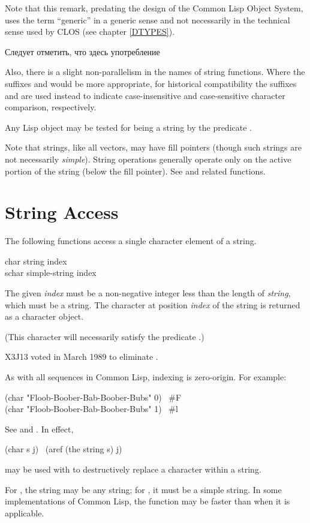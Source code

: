 \begin{new}
Note that this remark, predating the design of the Common Lisp Object System,
uses the term ``generic'' in a generic sense and not necessarily
in the technical sense used by CLOS
(see chapter \ref{DTYPES}).

Следует отметить, что здесь употребление 
\end{new}

Also, there is a slight non-parallelism in the names of string functions.
Where the suffixes  and  would be more appropriate,
for historical compatibility the suffixes  and \cdf{=} are used instead
to indicate case-insensitive and case-sensitive character comparison,
respectively.

Any Lisp object may be tested for being a string by
the predicate .

Note that strings, like all vectors, may have fill pointers
(though such strings are not necessarily \emph{simple}).
String operations generally operate only on the active portion of the string
(below the fill pointer).  See  and related
functions.

\section{String Access}

The following functions access a single character element of a string.

\begin{defun}[Function]
char string index \\
schar simple-string index

The given \emph{index} must be a non-negative integer less than
the length of \emph{string}, which must be a
string.  The character at position \emph{index}
of the string is returned as a character object.
\begin{obsolete}
(This character will necessarily satisfy the predicate .)
\end{obsolete}
\begin{newer}
X3J13 voted in March 1989 
to eliminate .
\end{newer}
As with all sequences in Common Lisp, indexing is zero-origin.
For example:
\begin{lisp}
(char "Floob-Boober-Bab-Boober-Bubs" 0) \EV\ \#{\Xbackslash}F \\
(char "Floob-Boober-Bab-Boober-Bubs" 1) \EV\ \#{\Xbackslash}l
\end{lisp}
See  and .  In effect,
\begin{lisp}
(char s j) \EQ\ (aref (the string s) j)
\end{lisp}
 may be used with  to destructively replace
a character within a string.

For , the string may be any string;
for , it must be a simple string.
In some implementations of Common Lisp, the function  may
be faster than  when it is applicable.
\end{defun}

